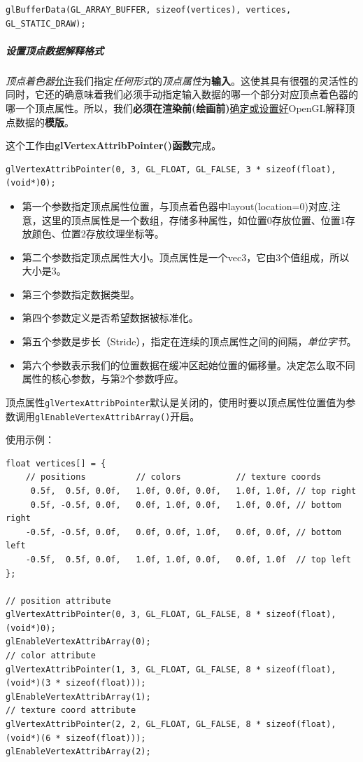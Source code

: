 \documentclass[UTF8,a4paper,12pt]{ctexbook}
\begin{document}
					\begin{lstlisting}
glBufferData(GL_ARRAY_BUFFER, sizeof(vertices), vertices, GL_STATIC_DRAW);					
					\end{lstlisting}
								
							
				\subparagraph{设置顶点数据解释格式}
					\textit{顶点着色器}\underline{允许}我们指定\textit{任何形式}的\textit{顶点属性}为\textbf{输入}。这使其具有很强的灵活性的同时，它还的确意味着我们必须手动指定输入数据的哪一个部分对应顶点着色器的哪一个顶点属性。所以，我们\textbf{必须在渲染前(绘画前)}\underline{确定或设置好}OpenGL解释顶点数据的\textbf{模版}。	
						
					这个工作由\textbf{glVertexAttribPointer()函数}完成。	
					
					\begin{lstlisting}
glVertexAttribPointer(0, 3, GL_FLOAT, GL_FALSE, 3 * sizeof(float), (void*)0);
					\end{lstlisting}
					
					\begin{itemize}
						\item 第一个参数指定顶点属性位置，与顶点着色器中layout(location=0)对应,注意，这里的顶点属性是一个数组，存储多种属性，如位置0存放位置、位置1存放颜色、位置2存放纹理坐标等。
						\item 第二个参数指定顶点属性大小。顶点属性是一个vec3，它由3个值组成，所以大小是3。
						\item 第三个参数指定数据类型。
						\item 第四个参数定义是否希望数据被标准化。
						\item 第五个参数是步长（Stride），指定在连续的顶点属性之间的间隔，\textit{单位字节}。
						\item 第六个参数表示我们的位置数据在缓冲区起始位置的偏移量。决定怎么取不同属性的核心参数，与第2个参数呼应。
					\end{itemize}
					
					顶点属性\verb|glVertexAttribPointer|默认是关闭的，使用时要以顶点属性位置值为参数调用\verb|glEnableVertexAttribArray()|开启。
					
					
					使用示例：
					\begin{lstlisting}
float vertices[] = {
    // positions          // colors           // texture coords
     0.5f,  0.5f, 0.0f,   1.0f, 0.0f, 0.0f,   1.0f, 1.0f, // top right
     0.5f, -0.5f, 0.0f,   0.0f, 1.0f, 0.0f,   1.0f, 0.0f, // bottom right
    -0.5f, -0.5f, 0.0f,   0.0f, 0.0f, 1.0f,   0.0f, 0.0f, // bottom left
    -0.5f,  0.5f, 0.0f,   1.0f, 1.0f, 0.0f,   0.0f, 1.0f  // top left 
};
 
// position attribute
glVertexAttribPointer(0, 3, GL_FLOAT, GL_FALSE, 8 * sizeof(float), (void*)0);
glEnableVertexAttribArray(0);
// color attribute
glVertexAttribPointer(1, 3, GL_FLOAT, GL_FALSE, 8 * sizeof(float), (void*)(3 * sizeof(float)));
glEnableVertexAttribArray(1);
// texture coord attribute
glVertexAttribPointer(2, 2, GL_FLOAT, GL_FALSE, 8 * sizeof(float), (void*)(6 * sizeof(float)));
glEnableVertexAttribArray(2);   	
					\end{lstlisting}
					
\end{document}
